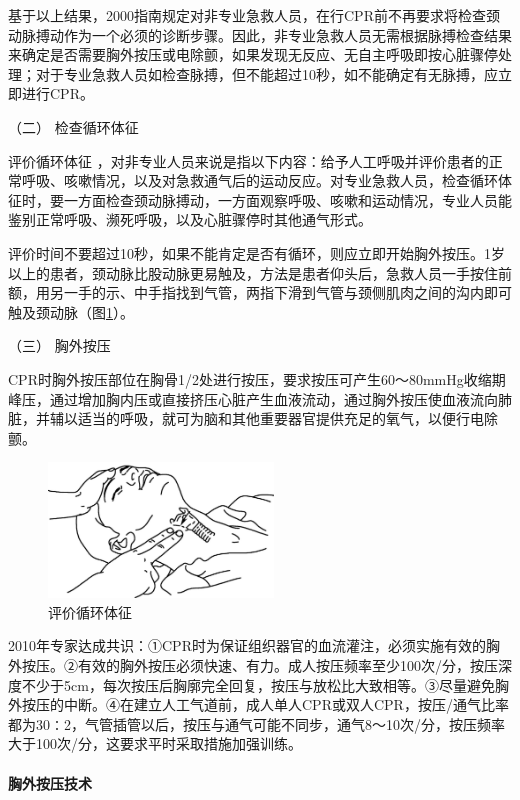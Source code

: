 基于以上结果，2000指南规定对非专业急救人员，在行CPR前不再要求将检查颈动脉搏动作为一个必须的诊断步骤。因此，非专业急救人员无需根据脉搏检查结果来确定是否需要胸外按压或电除颤，如果发现无反应、无自主呼吸即按心脏骤停处理；对于专业急救人员如检查脉搏，但不能超过10秒，如不能确定有无脉搏，应立即进行CPR。

\hypertarget{text00283.htmlux5cux23CHP10-1-4-4-2}{}
（二） 检查循环体征

评价循环体征
，对非专业人员来说是指以下内容：给予人工呼吸并评价患者的正常呼吸、咳嗽情况，以及对急救通气后的运动反应。对专业急救人员，检查循环体征时，要一方面检查颈动脉搏动，一方面观察呼吸、咳嗽和运动情况，专业人员能鉴别正常呼吸、濒死呼吸，以及心脏骤停时其他通气形式。

评价时间不要超过10秒，如果不能肯定是否有循环，则应立即开始胸外按压。1岁以上的患者，颈动脉比股动脉更易触及，方法是患者仰头后，急救人员一手按住前额，用另一手的示、中手指找到气管，两指下滑到气管与颈侧肌肉之间的沟内即可触及颈动脉（图\ref{fig101-5}）。

\hypertarget{text00283.htmlux5cux23CHP10-1-4-4-3}{}
（三） 胸外按压

CPR时胸外按压部位在胸骨1/2处进行按压，要求按压可产生60～80mmHg收缩期峰压，通过增加胸内压或直接挤压心脏产生血液流动，通过胸外按压使血液流向肺脏，并辅以适当的呼吸，就可为脑和其他重要器官提供充足的氧气，以便行电除颤。

\begin{figure}[!htbp]
 \centering
 \includegraphics[width=2.35417in,height=1.41667in]{./images/Image00408.jpg}
 \captionsetup{justification=centering}
 \caption{评价循环体征}
 \label{fig101-5}
  \end{figure} 

2010年专家达成共识：①CPR时为保证组织器官的血流灌注，必须实施有效的胸外按压。②有效的胸外按压必须快速、有力。成人按压频率至少100次/分，按压深度不少于5cm，每次按压后胸廓完全回复，按压与放松比大致相等。③尽量避免胸外按压的中断。④在建立人工气道前，成人单人CPR或双人CPR，按压/通气比率都为30∶2，气管插管以后，按压与通气可能不同步，通气8～10次/分，按压频率大于100次/分，这要求平时采取措施加强训练。

\paragraph{胸外按压技术}

